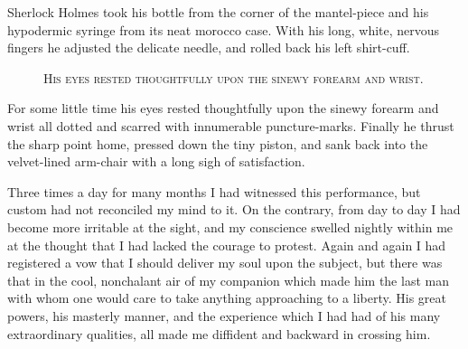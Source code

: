 \documentclass[12pt,english,oneside]{book}
\newcommand{\noun}[1]{\textsc{#1}}
\begin{document}
Sherlock Holmes took his bottle from the corner of the mantel-piece
and his hypodermic syringe from its neat morocco case. With his long,
white, nervous fingers he adjusted the delicate needle, and rolled
back his left shirt-cuff. %
\begin{figure}[htbp]
\noindent {}

\noindent \begin{center}\noun{His eyes rested thoughtfully upon
the sinewy forearm and wrist.}\end{center}
\end{figure}
For some little time his eyes rested thoughtfully upon the sinewy
forearm and wrist all dotted and scarred with innumerable puncture-marks.
Finally he thrust the sharp point home, pressed down the tiny piston,
and sank back into the velvet-lined arm-chair with a long sigh of
satisfaction.

Three times a day for many months I had witnessed this performance,
but custom had not reconciled my mind to it. On the contrary, from
day to day I had become more irritable at the sight, and my conscience
swelled nightly within me at the thought that I had lacked the courage
to protest. Again and again I had registered a vow that I should deliver
my soul upon the subject, but there was that in the cool, nonchalant
air of my companion which made him the last man with whom one would
care to take anything approaching to a liberty. His great powers,
his masterly manner, and the experience which I had had of his many
extraordinary qualities, all made me diffident and backward in crossing
him.
\end{document}
